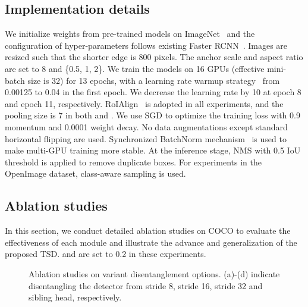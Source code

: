 \documentclass[10pt,twocolumn,letterpaper]{article}
\def \algname{TSD}
\begin{document}
\subsection{Implementation details}
We initialize weights from pre-trained models on ImageNet~\cite{russakovsky2015imagenet} and the configuration of hyper-parameters follows existing Faster RCNN~\cite{ren2015faster}.
Images are resized such that the shorter edge is 800 pixels.
The anchor scale and aspect ratio are set to 8 and \{0.5, 1, 2\}.
We train the models on 16 GPUs (effective mini-batch size is 32) for 13 epochs, with a learning rate warmup strategy~\cite{goyal2017accurate} from 0.00125 to 0.04 in the first epoch. We decrease the learning rate by 10 at epoch 8 and epoch 11, respectively.
RoIAlign~\cite{he2017mask} is adopted in all experiments, and the pooling size is 7 in both  and .
We use SGD to optimize the training loss with 0.9 momentum and 0.0001 weight decay. No data augmentations except standard horizontal flipping are used.
Synchronized BatchNorm mechanism~\cite{peng2018megdet,goyal2017accurate} is used to make multi-GPU training more stable.
At the inference stage, NMS with 0.5 IoU threshold is applied to remove duplicate boxes.
For experiments in the OpenImage dataset, class-aware sampling is used.

\subsection{Ablation studies}
In this section, we conduct detailed ablation studies on COCO  to evaluate the effectiveness of each module and illustrate the advance and generalization of the proposed \algname{}.  and  are set to 0.2 in these experiments.

\begin{figure}[t]
  \centering 
  \caption{Ablation studies on variant disentanglement options. (a)-(d) indicate disentangling the detector from stride 8, stride 16, stride 32 and sibling head, respectively.} 
  \label{fig:subfig}
\end{figure}
\end{document}
